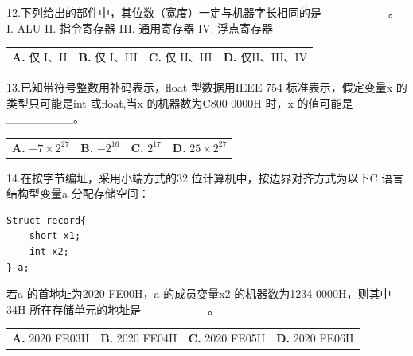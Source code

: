 \documentclass[UTF8,11pt]{ctexart}
\begin{document}
12.下列给出的部件中，其位数（宽度）一定与机器字长相同的是\_\_\_\_\_\_\_\_。 I. ALU II. 指令寄存器 III. 通用寄存器 IV. 浮点寄存器


\begin{center}\begin{tabular}{>{\raggedright\arraybackslash}p{\dimexpr(\linewidth-8\tabcolsep)/4\relax}>{\raggedright\arraybackslash}p{\dimexpr(\linewidth-8\tabcolsep)/4\relax}>{\raggedright\arraybackslash}p{\dimexpr(\linewidth-8\tabcolsep)/4\relax}>{\raggedright\arraybackslash}p{\dimexpr(\linewidth-8\tabcolsep)/4\relax}}
\textbf{A.} 仅 I、II & \textbf{B.} 仅 I、III & \textbf{C.} 仅 II、III & \textbf{D.} 仅II、III、IV\\[.35em]\end{tabular}\end{center}

13.已知带符号整数用补码表示，float 型数据用IEEE 754 标准表示，假定变量x 的类型只可能是int 或float,当x 的机器数为C800 0000H 时，x 的值可能是\_\_\_\_\_\_\_\_。


\begin{center}\begin{tabular}{>{\raggedright\arraybackslash}p{\dimexpr(\linewidth-8\tabcolsep)/4\relax}>{\raggedright\arraybackslash}p{\dimexpr(\linewidth-8\tabcolsep)/4\relax}>{\raggedright\arraybackslash}p{\dimexpr(\linewidth-8\tabcolsep)/4\relax}>{\raggedright\arraybackslash}p{\dimexpr(\linewidth-8\tabcolsep)/4\relax}}
\textbf{A.} \(\displaystyle -7\times2^{27}\) & \textbf{B.} \(\displaystyle -2^{16}\) & \textbf{C.} \(\displaystyle 2^{17}\) & \textbf{D.} \(\displaystyle 25\times2^{27}\)\\[.35em]\end{tabular}\end{center}

14.在按字节编址，采用小端方式的32 位计算机中，按边界对齐方式为以下C 语言结构型变量a 分配存储空间：


\begin{Verbatim}[breaklines,breakanywhere,fontsize=\small]
Struct record{
    short x1;
    int x2;
} a;
\end{Verbatim}

若a 的首地址为2020 FE00H，a 的成员变量x2 的机器数为1234 0000H，则其中34H 所在存储单元的地址是\_\_\_\_\_\_\_\_。


\begin{center}\begin{tabular}{>{\raggedright\arraybackslash}p{\dimexpr(\linewidth-8\tabcolsep)/4\relax}>{\raggedright\arraybackslash}p{\dimexpr(\linewidth-8\tabcolsep)/4\relax}>{\raggedright\arraybackslash}p{\dimexpr(\linewidth-8\tabcolsep)/4\relax}>{\raggedright\arraybackslash}p{\dimexpr(\linewidth-8\tabcolsep)/4\relax}}
\textbf{A.} 2020 FE03H & \textbf{B.} 2020 FE04H & \textbf{C.} 2020 FE05H & \textbf{D.} 2020 FE06H\\[.35em]\end{tabular}\end{center}
\end{document}
